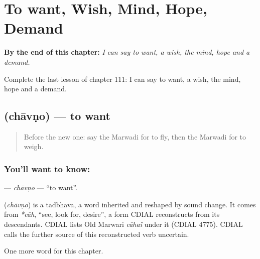 
\chapter{To want, Wish, Mind, Hope, Demand}
\label{ch:mw-to-want-wish-mind-hope-demand}

\begin{chapteropening}
\textbf{By the end of this chapter:} \emph{I can say to want, a wish, the mind, hope and a demand.}

Complete the last lesson of chapter 111: I can say to want, a wish, the mind, hope and a demand.
\end{chapteropening}

\section[\texorpdfstring{\mw{चावणो} (chāvṇo)}{चावणो (chāvṇo)}]{ (chāvṇo) — to want}

\label{lesson:MW-C111-chavno}



\begin{quote}
Before the new one: say the Marwadi for to fly, then the Marwadi for to weigh.
\end{quote}

\subsection*{You'll want to know: }
\textbf{} — \emph{chāvṇo} — \textquotedblleft{}to want\textquotedblright{}.

\begin{cousinweb}
\textbf{} (\emph{chāvṇo}) is a tadbhava, a word inherited and reshaped by sound change. It comes from \emph{*cāh}, \textquotedblleft{}see, look for, desire\textquotedblright{}, a form CDIAL reconstructs from its descendants. CDIAL lists Old Marwari \emph{cāhaï} under it (CDIAL 4775). CDIAL calls the further source of this reconstructed verb uncertain.
\end{cousinweb}

\begin{grammarlens}[title={What you've built}]
One more word for this chapter.
\end{grammarlens}

